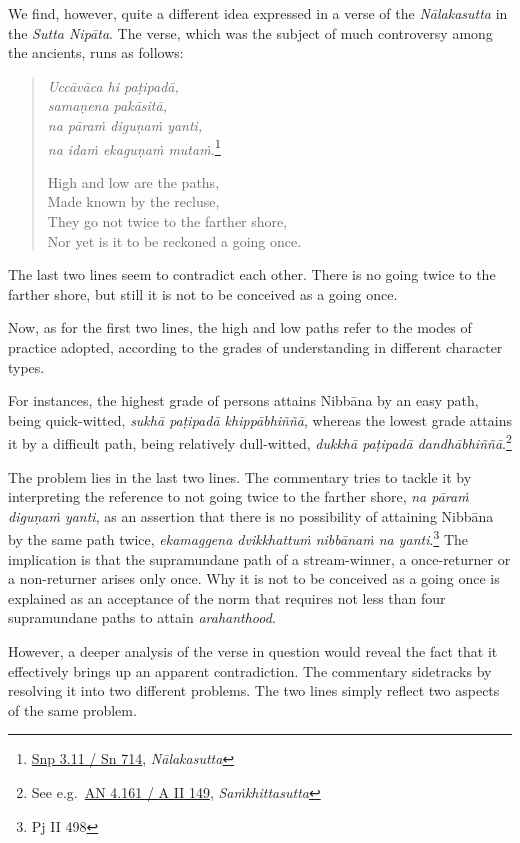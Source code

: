 We find, however, quite a different idea expressed in a verse of the \emph{Nālakasutta} in the \emph{Sutta Nipāta}. The verse, which was the subject of much controversy among the ancients, runs as follows:

\begin{quote}
\emph{Uccāvāca hi paṭipadā,}\\
\emph{samaṇena pakāsitā,}\\
\emph{na pāraṁ diguṇaṁ yanti,}\\
\emph{na idaṁ ekaguṇaṁ mutaṁ.}\footnote{\href{https://suttacentral.net/snp3.11/pli/ms}{Snp 3.11 / Sn 714}, \emph{Nālakasutta}}

High and low are the paths,\\
Made known by the recluse,\\
They go not twice to the farther shore,\\
Nor yet is it to be reckoned a going once.
\end{quote}

The last two lines seem to contradict each other. There is no going twice to the farther shore, but still it is not to be conceived as a going once.

Now, as for the first two lines, the high and low paths refer to the modes of practice adopted, according to the grades of understanding in different character types.

For instances, the highest grade of persons attains Nibbāna by an easy path, being quick-witted, \emph{sukhā paṭipadā khippābhiññā}, whereas the lowest grade attains it by a difficult path, being relatively dull-witted, \emph{dukkhā paṭipadā dandhābhiññā}.\footnote{See e.g.~\href{https://suttacentral.net/an4.161/pli/ms}{AN 4.161 / A II 149}, \emph{Saṁkhittasutta}}

The problem lies in the last two lines. The commentary tries to tackle it by interpreting the reference to not going twice to the farther shore, \emph{na pāraṁ diguṇaṁ yanti}, as an assertion that there is no possibility of attaining Nibbāna by the same path twice, \emph{ekamaggena dvikkhattuṁ nibbānaṁ na yanti}.\footnote{Pj II 498} The implication is that the supramundane path of a stream-winner, a once-returner or a non-returner arises only once. Why it is not to be conceived as a going once is explained as an acceptance of the norm that requires not less than four supramundane paths to attain \emph{arahanthood}.

However, a deeper analysis of the verse in question would reveal the fact that it effectively brings up an apparent contradiction. The commentary sidetracks by resolving it into two different problems. The two lines simply reflect two aspects of the same problem.

